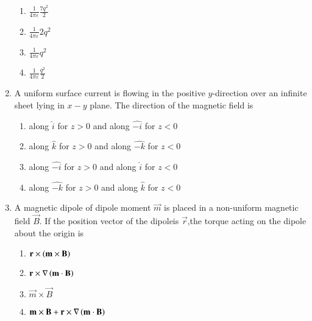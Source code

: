 \documentclass[journal,12pt,onecolumn]{IEEEtran}
\theoremstyle{remark}
\begin{document}
\begin{enumerate}[start=14]
\begin{center}
                \begin{enumerate}
        \item $\frac{1}{4\pi\varepsilon}\frac{7q^2}{2}$
        \item $\frac{1}{4\pi\varepsilon}2q^2$
        \item $\frac{1}{4\pi\varepsilon}q^2$
        \item $\frac{1}{4\pi\varepsilon}\frac{q^2}{2}$
                \end{enumerate}
\end{center}
\item A uniform surface current is flowing in the positive $y$-direction over an infinite sheet lying in $x-y$ plane. The direction of the magnetic field is
        \begin{enumerate}
\item along $\hat{i}$ for $z>0$ and along $\hat{-i}$ for $z<0$
\item along $\hat{k}$ for $z>0$ and along $\hat{-k}$ for $z<0$
\item along $\hat{-i}$ for $z>0$ and along $\hat{i}$ for $z<0$
\item along $\hat{-k}$ for $z>0$ and along $\hat{k}$ for $z<0$
        \end{enumerate}
\item A magnetic dipole of dipole moment $\vec{m}$ is placed in a non-uniform magnetic field $\vec{B}$. If the position vector of the dipoleis $\vec{r}$,the torque acting on the dipole about the origin is
        \begin{enumerate}
\item $\mathbf{r}\times\left(\mathbf{m}\times\mathbf{B}\right)$
\item $\mathbf{r}\times \nabla \left(\mathbf{m}\cdot\mathbf{B}\right)$
\item $\vec{m}\times\vec{B}$
\item $\mathbf{m}\times\mathbf{B}+\mathbf{r}\times\nabla\left(\mathbf{m}\cdot\mathbf{B}\right)$

\end{enumerate}
\end{enumerate}
\end{document}
